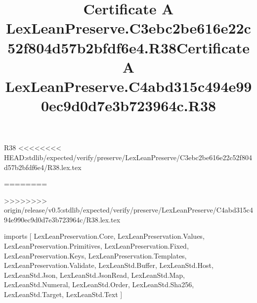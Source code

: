\begin{lexlean}{R38}
<<<<<<<< HEAD:stdlib/expected/verify/preserve/LexLeanPreserve/C3ebc2be616e22c52f804d57b2bfdf6e4/R38.lex.tex
\title{Certificate A LexLeanPreserve.C3ebc2be616e22c52f804d57b2bfdf6e4.R38}
========
\title{Certificate A LexLeanPreserve.C4abd315c494e990ec9d0d7e3b723964c.R38}
>>>>>>>> origin/release/v0.5:stdlib/expected/verify/preserve/LexLeanPreserve/C4abd315c494e990ec9d0d7e3b723964c/R38.lex.tex
\begin{coremodule}
imports [
  LexLeanPreservation.Core,
  LexLeanPreservation.Values,
  LexLeanPreservation.Primitives,
  LexLeanPreservation.Fixed,
  LexLeanPreservation.Keys,
  LexLeanPreservation.Templates,
  LexLeanPreservation.Validate,
  LexLeanStd.Buffer,
  LexLeanStd.Host,
  LexLeanStd.Json,
  LexLeanStd.JsonRead,
  LexLeanStd.Map,
  LexLeanStd.Numeral,
  LexLeanStd.Order,
  LexLeanStd.Sha256,
  LexLeanStd.Target,
  LexLeanStd.Text
]


\end{coremodule}
\end{lexlean}
